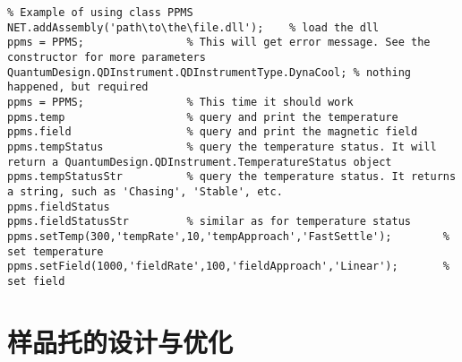             \begin{lstlisting}
% Example of using class PPMS
NET.addAssembly('path\to\the\file.dll');	% load the dll
ppms = PPMS;				% This will get error message. See the constructor for more parameters
QuantumDesign.QDInstrument.QDInstrumentType.DynaCool; % nothing happened, but required
ppms = PPMS;				% This time it should work
ppms.temp					% query and print the temperature
ppms.field					% query and print the magnetic field
ppms.tempStatus				% query the temperature status. It will return a QuantumDesign.QDInstrument.TemperatureStatus object
ppms.tempStatusStr			% query the temperature status. It returns a string, such as 'Chasing', 'Stable', etc.
ppms.fieldStatus
ppms.fieldStatusStr			% similar as for temperature status
ppms.setTemp(300,'tempRate',10,'tempApproach','FastSettle');		% set temperature
ppms.setField(1000,'fieldRate',100,'fieldApproach','Linear');		% set field
            \end{lstlisting}


            \section{样品托的设计与优化} %
            \label{sec:样品托的设计与优化}
            	


